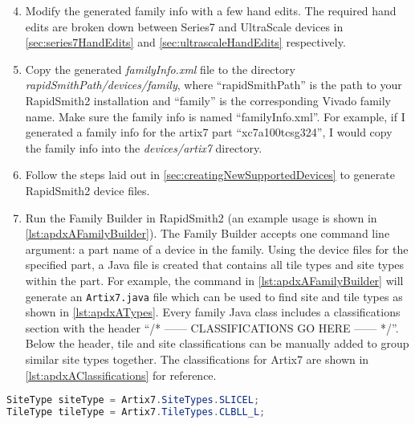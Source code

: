 \begin{enumerate}
\setcounter{enumi}{3}    
    \item Modify the generated family info with a few hand edits. The required hand
    edits are broken down between Series7 and UltraScale devices in
    \autoref{sec:series7HandEdits} and \autoref{sec:ultrascaleHandEdits}
    respectively.

	\item Copy the generated \textit{familyInfo.xml} file to the directory
	\textit{rapidSmithPath/devices/family}, where ``rapidSmithPath'' is the path to
	your RapidSmith2 installation and ``family'' is the corresponding Vivado family
	name. Make sure the family info is named ``familyInfo.xml''. For example, if I
	generated a family info for the artix7 part ``xc7a100tcsg324'', I would copy
	the family info into the \textit{devices/artix7} directory.

	\item Follow the steps laid out in \autoref{sec:creatingNewSupportedDevices} to
	generate RapidSmith2 device files.
	    
	\item Run the Family Builder in RapidSmith2 (an example usage is shown in
	\autoref{lst:apdxAFamilyBuilder}). The Family Builder accepts one command line
	argument: a part name of a device in the family. Using the device files for
	the specified part, a Java file is created that contains all tile types and
	site types within the part. For example, the command in
	\autoref{lst:apdxAFamilyBuilder} will generate an \texttt{Artix7.java} file
	which can be used to find site and tile types as shown in
	\autoref{lst:apdxATypes}. Every family Java class includes a classifications
	section with the header ``/* ------ CLASSIFICATIONS GO HERE ------ */''. Below
	the header, tile and site classifications can be manually added to group
	similar site types together. The classifications for Artix7 are shown in
	\autoref{lst:apdxAClassifications} for reference.
	
\end{enumerate}

\begin{lstlisting}[language=java,numbers=none, caption=How to access SiteTypes
and TileTypes in RapidSmith2, label=lst:apdxATypes] 
SiteType siteType = Artix7.SiteTypes.SLICEL; 
TileType tileType = Artix7.TileTypes.CLBLL_L;
\end{lstlisting}

